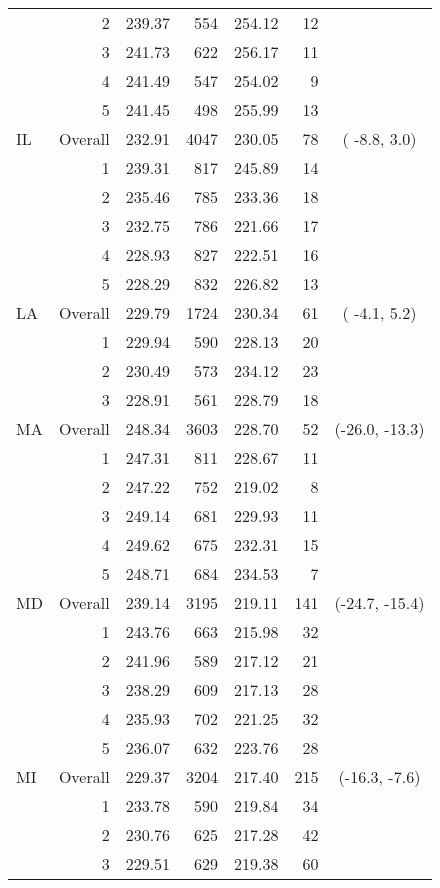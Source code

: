 \begin{longtable}{lrrr@{\extracolsep{.25cm}}rrc}
   & 2 & 239.37 & 554 & 254.12 &  12 &  \\ 
   & 3 & 241.73 & 622 & 256.17 &  11 &  \\ 
   & 4 & 241.49 & 547 & 254.02 &   9 &  \\ 
   & 5 & 241.45 & 498 & 255.99 &  13 &  \\ 
   \hline
IL & Overall & 232.91 & 4047 & 230.05 &  78 & ( -8.8,   3.0) \\ 
   & 1 & 239.31 & 817 & 245.89 &  14 &  \\ 
   & 2 & 235.46 & 785 & 233.36 &  18 &  \\ 
   & 3 & 232.75 & 786 & 221.66 &  17 &  \\ 
   & 4 & 228.93 & 827 & 222.51 &  16 &  \\ 
   & 5 & 228.29 & 832 & 226.82 &  13 &  \\ 
   \hline
LA & Overall & 229.79 & 1724 & 230.34 &  61 & ( -4.1,   5.2) \\ 
   & 1 & 229.94 & 590 & 228.13 &  20 &  \\ 
   & 2 & 230.49 & 573 & 234.12 &  23 &  \\ 
   & 3 & 228.91 & 561 & 228.79 &  18 &  \\ 
   \hline
MA & Overall & 248.34 & 3603 & 228.70 &  52 & (-26.0, -13.3) \\ 
   & 1 & 247.31 & 811 & 228.67 &  11 &  \\ 
   & 2 & 247.22 & 752 & 219.02 &   8 &  \\ 
   & 3 & 249.14 & 681 & 229.93 &  11 &  \\ 
   & 4 & 249.62 & 675 & 232.31 &  15 &  \\ 
   & 5 & 248.71 & 684 & 234.53 &   7 &  \\ 
   \hline
MD & Overall & 239.14 & 3195 & 219.11 & 141 & (-24.7, -15.4) \\ 
   & 1 & 243.76 & 663 & 215.98 &  32 &  \\ 
   & 2 & 241.96 & 589 & 217.12 &  21 &  \\ 
   & 3 & 238.29 & 609 & 217.13 &  28 &  \\ 
   & 4 & 235.93 & 702 & 221.25 &  32 &  \\ 
   & 5 & 236.07 & 632 & 223.76 &  28 &  \\ 
   \hline
MI & Overall & 229.37 & 3204 & 217.40 & 215 & (-16.3,  -7.6) \\ 
   & 1 & 233.78 & 590 & 219.84 &  34 &  \\ 
   & 2 & 230.76 & 625 & 217.28 &  42 &  \\ 
   & 3 & 229.51 & 629 & 219.38 &  60 &  \\ 

\end{longtable}
